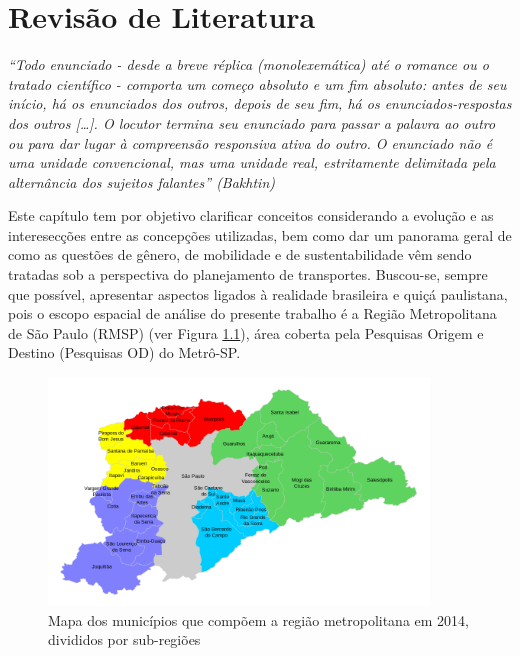 \chapter{Revisão de Literatura}\label{chap:revisao-literatura}
\begin{citacao}
	\begin{flushright}  
\emph{``Todo enunciado - desde a breve réplica (monolexemática) até o romance ou o tratado científico - comporta um começo absoluto e um fim absoluto: antes de seu início, há os enunciados dos outros, depois de seu fim, há os enunciados-respostas dos outros [\ldots]. O locutor termina seu enunciado para passar a palavra ao outro ou para dar lugar à compreensão responsiva ativa do outro. O enunciado não é uma unidade convencional, mas uma unidade real, estritamente delimitada pela alternância dos sujeitos falantes'' (Bakhtin)}
	\end{flushright}
\end{citacao}

Este capítulo tem por objetivo clarificar conceitos considerando a evolução e as interesecções entre as concepções utilizadas, bem como dar um panorama geral de como as questões de gênero, de mobilidade e de sustentabilidade vêm sendo tratadas sob a perspectiva do planejamento de transportes. 
Buscou-se, sempre que possível, apresentar aspectos ligados à realidade brasileira e quiçá paulistana, pois o escopo espacial de análise do presente trabalho é a Região Metropolitana de São Paulo (RMSP) (ver Figura \ref{fig:mapa-rmsp}), área coberta pela Pesquisas Origem e Destino (Pesquisas OD) do Metrô-SP. 

\begin{figure}[htb]%
    \caption{\label{fig:mapa-rmsp}Mapa dos municípios que compõem a região metropolitana em 2014, divididos por sub-regiões}%
    \begin{center}%
        \includegraphics[width=0.9\textwidth]{./imagens/Mapa-RMSP-subregions.png}%
    \end{center}%
\end{figure}%

